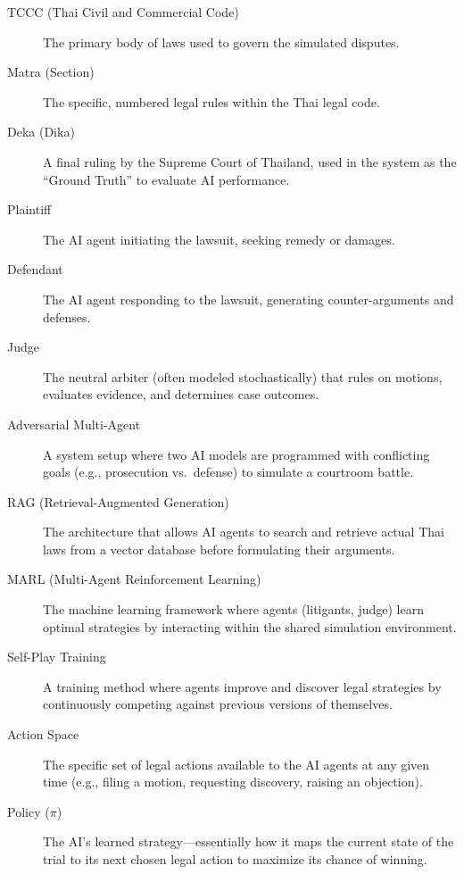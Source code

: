 \begin{description}

\item[TCCC (Thai Civil and Commercial Code)] The primary body of laws used to govern the simulated disputes.

\item[Matra (Section)] The specific, numbered legal rules within the Thai legal code.

\item[Deka (Dika)] A final ruling by the Supreme Court of Thailand, used in the system as the ``Ground Truth'' to evaluate AI performance.

\item[Plaintiff] The AI agent initiating the lawsuit, seeking remedy or damages.

\item[Defendant] The AI agent responding to the lawsuit, generating counter-arguments and defenses.

\item[Judge] The neutral arbiter (often modeled stochastically) that rules on motions, evaluates evidence, and determines case outcomes.

\item[Adversarial Multi-Agent] A system setup where two AI models are programmed with conflicting goals (e.g., prosecution vs.\ defense) to simulate a courtroom battle.

\item[RAG (Retrieval-Augmented Generation)] The architecture that allows AI agents to search and retrieve actual Thai laws from a vector database before formulating their arguments.

\item[MARL (Multi-Agent Reinforcement Learning)] The machine learning framework where agents (litigants, judge) learn optimal strategies by interacting within the shared simulation environment.

\item[Self-Play Training] A training method where agents improve and discover legal strategies by continuously competing against previous versions of themselves.

\item[Action Space] The specific set of legal actions available to the AI agents at any given time (e.g., filing a motion, requesting discovery, raising an objection).

\item[Policy ($\pi$)] The AI's learned strategy---essentially how it maps the current state of the trial to its next chosen legal action to maximize its chance of winning.


\end{description}

